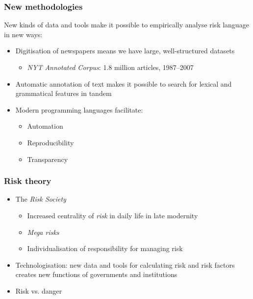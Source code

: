 \documentclass{beamer}       %
\begin{document}
\begin{frame}
    \frametitle{New methodologies}

    New kinds of data and tools make it possible to empirically analyse risk language in new ways:
    
    \begin{itemize}
    \item Digitisation of newspapers means we have large, well-structured datasets
    \begin{itemize}
        \item \emph{NYT Annotated Corpus}: 1.8 million articles, 1987--2007 \cite{sandhaus_new_2008}
    \end{itemize}
    \item Automatic annotation of text makes it possible to search for lexical and grammatical features in tandem
    \item Modern programming languages facilitate:
    \begin{itemize}
        \item Automation
        \item Reproducibility
        \item Transparency
    \end{itemize}
    \end{itemize}

\end{frame}


\begin{frame}
    \frametitle{Risk theory}
    
    \begin{itemize}
    \item The \emph{Risk Society} \cite{beck_risk_1992}
    \begin{itemize}
        \item Increased centrality of \emph{risk} in daily life in late modernity
        \item \emph{Mega risks}
        \item Individualisation of responsibility for managing risk
    \end{itemize}
    \item Technologisation: new data and tools for calculating risk and risk factors creates new functions of governments and institutions
    \item Risk vs. danger \cite{luhmann_ecological_1989}
    \end{itemize}
\end{frame}
\end{document}
